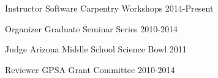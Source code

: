 



\begin{cvhonors}

  \cvhonor
    {Instructor} %
    {Software Carpentry Workshops} %
    {} %
    {2014-Present} %

  \cvhonor
    {Organizer} %
    {Graduate Seminar Series} %
    {} %
    {2010-2014} %

  \cvhonor
    {Judge} %
    {Arizona Middle School Science Bowl} %
    {} %
    {2011} %

  \cvhonor
    {Reviewer} %
    {GPSA Grant Committee} %
    {} %
    {2010-2014} %


\end{cvhonors}

